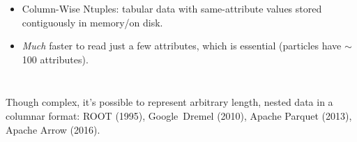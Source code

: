 \documentclass[aspectratio=169]{beamer}
\begin{document}
\begin{frame}{}
\begin{columns}[t]
\vspace{0.25 cm}
\begin{itemize}
\item Column-Wise Ntuples: tabular data with same-attribute values stored contiguously in memory/on disk.
\item {\it Much} faster to read just a few attributes, which is essential (particles have $\sim$100 attributes).
\end{itemize}

\end{columns}

\begin{columns}

\begin{center}
Though complex, it's possible to represent arbitrary length, nested data in a columnar format: ROOT (1995), Google~Dremel (2010), Apache Parquet (2013), Apache Arrow (2016).
\end{center}
\end{columns}
\end{frame}
\end{document}
